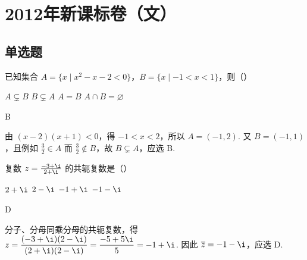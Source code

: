 \chapter{2012年新课标卷（文）}

\section{单选题}

\begin{problem}
已知集合 \(A = \{x \mid x^2 - x - 2 < 0\}\)，\(B = \{x \mid -1 < x < 1\}\)，则（\quad）

\choices
    {\(A \subsetneq B\)}
    {\(B \subsetneq A\)}
    {\(A = B\)}
    {\(A \cap B = \varnothing\)}

\begin{answer}
B
\end{answer}

\begin{solution}
由 \((x-2)(x+1)<0\)，得 \(-1<x<2\)，所以
\(A=(-1,2)\). 又 \(B=(-1,1)\)，且例如 \(\frac{3}{2}\in A\) 而 \(\frac{3}{2}\notin B\)，故 \(B\subsetneq A\)，应选 B.
\end{solution}
\end{problem}

\begin{problem}
复数 \(z = \frac{-3 + \i}{2 + \i}\) 的共轭复数是（\quad）

\choices
    {\(2 + \i\)}
    {\(2 - \i\)}
    {\(-1 + \i\)}
    {\(-1 - \i\)}

\begin{answer}
D
\end{answer}

\begin{solution}
分子、分母同乘分母的共轭复数，得
\(z=\dfrac{(-3+\i)(2-\i)}{(2+\i)(2-\i)}=\dfrac{-5+5\i}{5}=-1+\i\). 因此 \(\overline{z}=-1-\i\)，应选 D.
\end{solution}
\end{problem}

